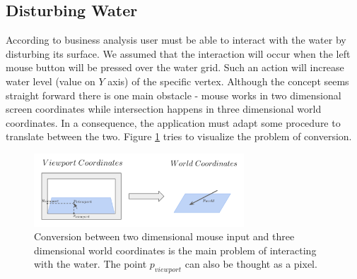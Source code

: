 \documentclass{report}
\begin{document}
\subsection{Disturbing Water} \label{subsec: disturbing_water}
According to business analysis user must be able to interact with the water by disturbing its surface. We assumed that the interaction will occur when the left mouse button will be pressed over the water grid. Such an action will increase water level (value on $Y$ axis) of the specific vertex. Although the concept seems straight forward there is one main obstacle - mouse works in two dimensional screen coordinates while intersection happens in three dimensional world coordinates. In a consequence, the application must adapt some procedure to translate between the two. Figure \ref{fig:screen_to_world} tries to visualize the problem of conversion.

\begin{figure}[H]
    \centering
    \includegraphics[width=0.7\textwidth]{images/screen_to_world.pdf}
    \caption{Conversion between two dimensional mouse input and three dimensional world coordinates is the main problem of interacting with the water. The point $p_{viewport}$ can also be thought as a pixel.}
    \label{fig:screen_to_world}
\end{figure}
\end{document}
